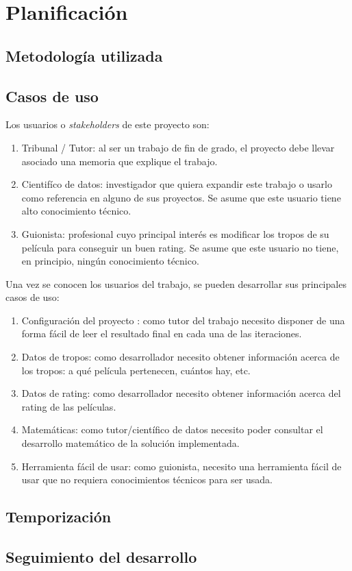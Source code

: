 \chapter{Planificación}

\section{Metodología utilizada}


\section{Casos de uso}

Los usuarios o \textit{stakeholders} de este proyecto son:

\begin{enumerate}
    \item Tribunal / Tutor: al ser un trabajo de fin de grado, el proyecto debe llevar asociado una memoria
          que explique el trabajo.
    \item Cientifíco de datos: investigador que quiera expandir este trabajo o usarlo como
          referencia en alguno de sus proyectos. Se asume que este usuario tiene alto conocimiento técnico.
    \item Guionista: profesional cuyo principal interés es modificar los tropos de su película para
          conseguir un buen rating. Se asume que este usuario no tiene, en principio, ningún conocimiento
          técnico.
\end{enumerate}

Una vez se conocen los usuarios del trabajo, se pueden desarrollar sus principales casos de uso:

\begin{enumerate}
    \item \label{uc:configuration} Configuración del proyecto \cite{configuration_milestone}: como
          tutor del trabajo necesito disponer de una forma fácil de leer el resultado final en cada
          una de las iteraciones.
    \item \label{uc:trope_data} Datos de tropos: como desarrollador necesito obtener información acerca de los
          tropos: a qué película pertenecen, cuántos hay, etc.
    \item \label{uc:rating_data} Datos de rating: como desarrollador necesito obtener información acerca del rating
          de las películas.
    \item \label{uc:math} Matemáticas: como tutor/científico de datos necesito poder consultar el desarrollo
          matemático de la solución implementada.
    \item \label{uc:user_friendly_tool} Herramienta fácil de usar: como guionista, necesito una herramienta
          fácil de usar que no requiera conocimientos técnicos para ser usada.
\end{enumerate}

\section{Temporización}

\section{Seguimiento del desarrollo}
